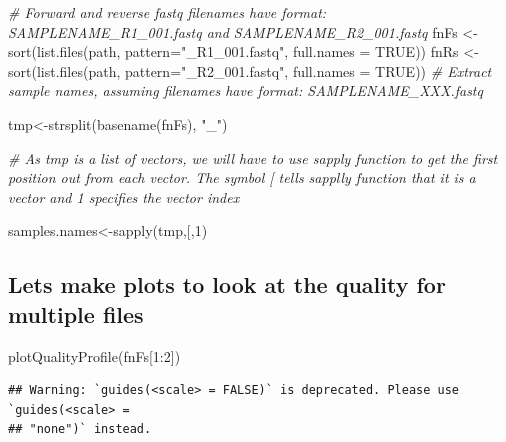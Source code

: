 \documentclass[
]{book}
\newenvironment{Shaded}{\begin{snugshade}}{\end{snugshade}}
\newcommand{\AttributeTok}[1]{\textcolor[rgb]{0.77,0.63,0.00}{#1}}
\newcommand{\CommentTok}[1]{\textcolor[rgb]{0.56,0.35,0.01}{\textit{#1}}}
\newcommand{\ConstantTok}[1]{\textcolor[rgb]{0.00,0.00,0.00}{#1}}
\newcommand{\DecValTok}[1]{\textcolor[rgb]{0.00,0.00,0.81}{#1}}
\newcommand{\FunctionTok}[1]{\textcolor[rgb]{0.00,0.00,0.00}{#1}}
\newcommand{\NormalTok}[1]{#1}
\newcommand{\OtherTok}[1]{\textcolor[rgb]{0.56,0.35,0.01}{#1}}
\newcommand{\SpecialCharTok}[1]{\textcolor[rgb]{0.00,0.00,0.00}{#1}}
\newcommand{\StringTok}[1]{\textcolor[rgb]{0.31,0.60,0.02}{#1}}
\begin{document}
\begin{Shaded}
\begin{Highlighting}[]
\CommentTok{\# Forward and reverse fastq filenames have format: SAMPLENAME\_R1\_001.fastq and SAMPLENAME\_R2\_001.fastq}
\NormalTok{fnFs }\OtherTok{\textless{}{-}} \FunctionTok{sort}\NormalTok{(}\FunctionTok{list.files}\NormalTok{(path, }\AttributeTok{pattern=}\StringTok{"\_R1\_001.fastq"}\NormalTok{, }\AttributeTok{full.names =} \ConstantTok{TRUE}\NormalTok{))}
\NormalTok{fnRs }\OtherTok{\textless{}{-}} \FunctionTok{sort}\NormalTok{(}\FunctionTok{list.files}\NormalTok{(path, }\AttributeTok{pattern=}\StringTok{"\_R2\_001.fastq"}\NormalTok{, }\AttributeTok{full.names =} \ConstantTok{TRUE}\NormalTok{))}
\CommentTok{\# Extract sample names, assuming filenames have format: SAMPLENAME\_XXX.fastq}


\NormalTok{tmp}\OtherTok{\textless{}{-}}\FunctionTok{strsplit}\NormalTok{(}\FunctionTok{basename}\NormalTok{(fnFs), }\StringTok{"\_"}\NormalTok{)}


\CommentTok{\# As tmp is a list of vectors, we will have to use sapply function to get the first position out from each vector. The symbol \textquotesingle{}[\textquotesingle{} tells sapplly function that it is a vector and 1 specifies the vector index}

\NormalTok{samples.names}\OtherTok{\textless{}{-}}\FunctionTok{sapply}\NormalTok{(tmp,}\StringTok{\textquotesingle{}[\textquotesingle{}}\NormalTok{,}\DecValTok{1}\NormalTok{)}
\end{Highlighting}
\end{Shaded}

\hypertarget{lets-make-plots-to-look-at-the-quality-for-multiple-files}{%
\subsection{Lets make plots to look at the quality for multiple files}\label{lets-make-plots-to-look-at-the-quality-for-multiple-files}}

\begin{Shaded}
\begin{Highlighting}[]
\FunctionTok{plotQualityProfile}\NormalTok{(fnFs[}\DecValTok{1}\SpecialCharTok{:}\DecValTok{2}\NormalTok{])}
\end{Highlighting}
\end{Shaded}

\begin{verbatim}
## Warning: `guides(<scale> = FALSE)` is deprecated. Please use `guides(<scale> =
## "none")` instead.
\end{verbatim}
\end{document}
